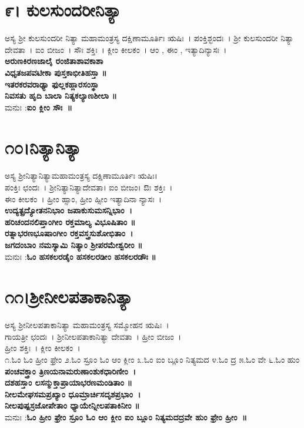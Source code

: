 \section{೯। ಕುಲಸುಂದರೀನಿತ್ಯಾ}
ಅಸ್ಯ ಶ್ರೀ ಕುಲಸುಂದರೀ ನಿತ್ಯಾ ಮಹಾಮಂತ್ರಸ್ಯ ದಕ್ಷಿಣಾಮೂರ್ತಿಃ ಋಷಿಃ~। ಪಂಕ್ತಿಶ್ಛಂದಃ~। ಶ್ರೀ ಕುಲಸುಂದರೀ ನಿತ್ಯಾ ದೇವತಾ~। ಐಂ ಬೀಜಂ~। ಸೌಃ ಶಕ್ತಿಃ~। ಕ್ಲೀಂ ಕೀಲಕಂ~। ಆಂ , ಈಂ , ಇತ್ಯಾದಿನ್ಯಾಸಃ~।\\
{\bfseries ಅರುಣಕಿರಣಜಾಲೈ ರಂಜಿತಾಶಾವಕಾಶಾ\\
ವಿಧೃತಜಪವಟೀಕಾ ಪುಸ್ತಕಾಭೀತಿಹಸ್ತಾ ॥\\
ಇತರಕರವರಾಢ್ಯಾ ಫುಲ್ಲಕಹ್ಲಾರಸಂಸ್ಥಾ\\
ನಿವಸತು ಹೃದಿ ಬಾಲಾ ನಿತ್ಯಕಲ್ಯಾಣಶೀಲಾ ॥\\}
ಮನುಃ :{\bfseries  ಐಂ ಕ್ಲೀಂ ಸೌಃ~॥}
\section{೧೦।ನಿತ್ಯಾನಿತ್ಯಾ}
ಅಸ್ಯ ಶ್ರೀನಿತ್ಯಾನಿತ್ಯಾಮಹಾಮಂತ್ರಸ್ಯ ದಕ್ಷಿಣಾಮೂರ್ತಿಃ ಋಷಿಃ।\\ ಪಂಕ್ತಿಃ ಛಂದಃ~। ಶ್ರೀನಿತ್ಯಾನಿತ್ಯಾದೇವತಾ। ಐಂ ಬೀಜಂ। ಔಃ ಶಕ್ತಿಃ~।\\ ಈಂ ಕೀಲಕಂ~। ಹ್ರೀಂ ಹ್ಸಾಂ, ಹ್ರೀಂ ಹ್ಸೀಂ ಇತ್ಯಾದಿನಾ ನ್ಯಾಸಃ~।\\
{\bfseries ಉದ್ಯತ್ಪ್ರದ್ಯೋತನನಿಭಾಂ ಜಪಾಕುಸುಮಸನ್ನಿಭಾಂ~।\\
ಹರಿಚಂದನಲಿಪ್ತಾಂಗೀಂ ರಕ್ತಮಾಲ್ಯ ವಿಭೂಷಿತಾಂ ॥\\
ರತ್ನಾಭರಣಭೂಷಾಂಗೀಂ ರಕ್ತವಸ್ತ್ರಸುಶೋಭಿತಾಂ~।\\
ಜಗದಂಬಾಂ ನಮಸ್ಯಾಮಿ ನಿತ್ಯಾಂ ಶ್ರೀಪರಮೇಶ್ವರೀಂ ॥\\}
ಮನುಃ :{\bfseries  ಓಂ ಹಸಕಲರಡೈಂ ಹಸಕಲರಡೀಂ ಹಸಕಲರಡೌಃ ॥}
\section{೧೧।ಶ್ರೀನೀಲಪತಾಕಾನಿತ್ಯಾ}
ಅಸ್ಯ ಶ್ರೀನೀಲಪತಾಕಾನಿತ್ಯಾ ಮಹಾಮಂತ್ರಸ್ಯ ಸಮ್ಮೋಹನ ಋಷಿಃ~। \\ಗಾಯತ್ರೀ ಛಂದಃ~। ಶ್ರೀನೀಲಪತಾಕಾನಿತ್ಯಾ ದೇವತಾ~। ಹ್ರೀಂ ಬೀಜಂ~।\\ ಹ್ರೀಂ ಶಕ್ತಿಃ~। ಕ್ಲೀಂ ಕೀಲಕಂ~।\\
೧.ಓಂ ಓಂ ಹ್ರೀಂ ಫ್ರೇಂ ೨.ಓಂ ಸ್ರೂಂ ಓಂ ಆಂ ಕ್ಲೀಂ ೩.ಓಂ ಐಂ ಬ್ಲೂಂ ನಿತ್ಯಮದ ೪.ಓಂ ದ್ರ ೫.ಓಂ ವೇ ೬.ಓಂ ಹುಂ \\
{\bfseries ಪಂಚವಕ್ತ್ರಾಂ ತ್ರಿಣಯನಾಮರುಣಾಂಶುಕಧಾರಿಣೀಂ~।\\
ದಶಹಸ್ತಾಂ ಲಸನ್ಮುಕ್ತಾಪ್ರಾಯಾಭರಣಮಂಡಿತಾಂ ॥\\
ನೀಲಮೇಘಸಮಪ್ರಖ್ಯಾಂ ಧೂಮ್ರಾರ್ಚಿಸದೃಶಪ್ರಭಾಂ~।\\
ನೀಲಪುಷ್ಪಸ್ರಜೋಪೇತಾಂ ಧ್ಯಾಯೇನ್ನೀಲಪತಾಕಿನೀಂ ॥\\}
ಮನುಃ :{\bfseries ಓಂ ಹ್ರೀಂ ಫ್ರೇಂ ಸ್ರೂಂ ಓಂ ಆಂ ಕ್ಲೀಂ ಐಂ ಬ್ಲೂಂ ನಿತ್ಯಮದದ್ರವೇ ಹುಂ ಫ್ರೇಂ ಹ್ರೀಂ~॥}
